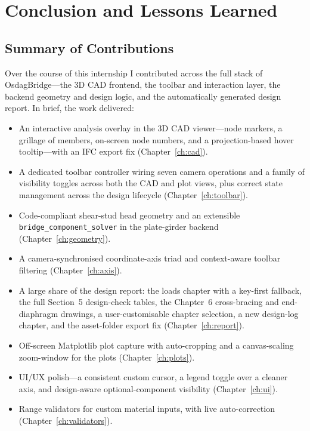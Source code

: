 \chapter{Conclusion and Lessons Learned}
\label{ch:conclusion}

\section{Summary of Contributions}
Over the course of this internship I contributed across the full stack of OsdagBridge---the 3D
CAD frontend, the toolbar and interaction layer, the backend geometry and design logic, and the
automatically generated design report. In brief, the work delivered:

\begin{itemize}[leftmargin=1.4em]
  \item An interactive analysis overlay in the 3D CAD viewer---node markers, a grillage of
        members, on-screen node numbers, and a projection-based hover tooltip---with an IFC
        export fix (Chapter~\ref{ch:cad}).
  \item A dedicated toolbar controller wiring seven camera operations and a family of
        visibility toggles across both the CAD and plot views, plus correct state management
        across the design lifecycle (Chapter~\ref{ch:toolbar}).
  \item Code-compliant shear-stud head geometry and an extensible
        \texttt{bridge\_component\_solver} in the plate-girder backend
        (Chapter~\ref{ch:geometry}).
  \item A camera-synchronised coordinate-axis triad and context-aware toolbar filtering
        (Chapter~\ref{ch:axis}).
  \item A large share of the design report: the loads chapter with a key-first fallback, the
        full Section~5 design-check tables, the Chapter~6 cross-bracing and end-diaphragm
        drawings, a user-customisable chapter selection, a new design-log chapter, and the
        asset-folder export fix (Chapter~\ref{ch:report}).
  \item Off-screen Matplotlib plot capture with auto-cropping and a canvas-scaling zoom-window
        for the plots (Chapter~\ref{ch:plots}).
  \item UI/UX polish---a consistent custom cursor, a legend toggle over a cleaner axis, and
        design-aware optional-component visibility (Chapter~\ref{ch:ui}).
  \item Range validators for custom material inputs, with live auto-correction
        (Chapter~\ref{ch:validators}).
\end{itemize}

